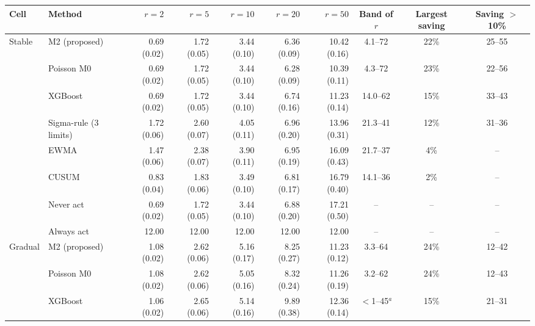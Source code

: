 \documentclass[10pt,a4paper]{article}
\begin{document}
{\scriptsize\centering
\begin{tabular}{llrrrrrccc}
\toprule
Cell & Method & $r=2$ & $r=5$ & $r=10$ & $r=20$ & $r=50$ & Band of $r$ & Largest saving & Saving $>$ 10\% \\
\midrule
Stable & M2 (proposed) & 0.69 (0.02) & 1.72 (0.05) & 3.44 (0.10) & 6.36 (0.09) & 10.42 (0.16) & 4.1--72 & 22\% & 25--55 \\
 & Poisson M0 & 0.69 (0.02) & 1.72 (0.05) & 3.44 (0.10) & 6.28 (0.09) & 10.39 (0.11) & 4.3--72 & 23\% & 22--56 \\
 & XGBoost & 0.69 (0.02) & 1.72 (0.05) & 3.44 (0.10) & 6.74 (0.16) & 11.23 (0.14) & 14.0--62 & 15\% & 33--43 \\
 & Sigma-rule (3 limits) & 1.72 (0.06) & 2.60 (0.07) & 4.05 (0.11) & 6.96 (0.20) & 13.96 (0.31) & 21.3--41 & 12\% & 31--36 \\
 & EWMA & 1.47 (0.06) & 2.38 (0.07) & 3.90 (0.11) & 6.95 (0.19) & 16.09 (0.43) & 21.7--37 & 4\% & -- \\
 & CUSUM & 0.83 (0.04) & 1.83 (0.06) & 3.49 (0.10) & 6.81 (0.17) & 16.79 (0.40) & 14.1--36 & 2\% & -- \\
 & Never act & 0.69 (0.02) & 1.72 (0.05) & 3.44 (0.10) & 6.88 (0.20) & 17.21 (0.50) & -- & -- & -- \\
 & Always act & 12.00 & 12.00 & 12.00 & 12.00 & 12.00 & -- & -- & -- \\
\addlinespace
Gradual & M2 (proposed) & 1.08 (0.02) & 2.62 (0.06) & 5.16 (0.17) & 8.25 (0.27) & 11.23 (0.12) & 3.3--64 & 24\% & 12--42 \\
 & Poisson M0 & 1.08 (0.02) & 2.62 (0.06) & 5.05 (0.16) & 8.32 (0.24) & 11.26 (0.19) & 3.2--62 & 24\% & 12--43 \\
 & XGBoost & 1.06 (0.02) & 2.65 (0.06) & 5.14 (0.16) & 9.89 (0.38) & 12.36 (0.14) & $<$1--45$^{a}$ & 15\% & 21--31 \\

\end{tabular}}
\end{document}
